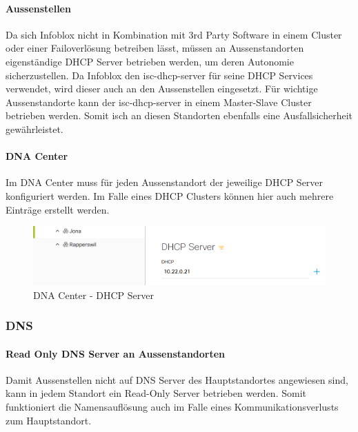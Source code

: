 \paragraph{Aussenstellen}
Da sich Infoblox nicht in Kombination mit 3rd Party Software in einem Cluster oder einer Failoverlösung betreiben lässt, müssen an Aussenstandorten eigenständige DHCP Server betrieben werden, um deren Autonomie sicherzustellen. Da Infoblox den isc-dhcp-server für seine DHCP Services verwendet, wird dieser auch an den Aussenstellen eingesetzt. 
Für wichtige Aussenstandorte kann der isc-dhcp-server in einem Master-Slave Cluster betrieben werden. Somit isch an diesen Standorten ebenfalls eine Ausfallsicherheit gewährleistet.

\paragraph{DNA Center}
Im DNA Center muss für jeden Aussenstandort der jeweilige DHCP Server konfiguriert werden. Im Falle eines DHCP Clusters können hier auch mehrere Einträge erstellt werden.

\begin{figure}[H]
	\centering
	\includegraphics[width=0.8\linewidth]{img/Absicherung/DNA_Center_DHCP-Server.png}
	\caption{DNA Center - DHCP Server }
	\label{fig:DNA Center - DHCP Server}
\end{figure}

\subsubsection{DNS}

\paragraph{Read Only DNS Server an Aussenstandorten}
	
Damit Aussenstellen nicht auf DNS Server des Hauptstandortes angewiesen sind, kann in jedem Standort ein Read-Only Server betrieben werden. Somit funktioniert die Namensauflösung auch im Falle eines Kommunikationsverlusts zum Hauptstandort. 

